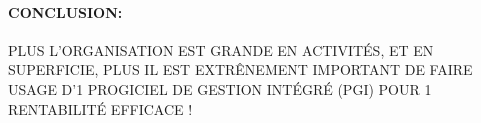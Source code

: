 \documentclass[12pt, a4paper]{article}
\newcommand{\yerothvert}[1]{\textcolor{yerothColorGreen}{#1}\xspace}
\begin{document}
\paragraph{CONCLUSION:}

\yerothvert{PLUS L'ORGANISATION EST GRANDE EN ACTIVITÉS, ET EN
SUPERFICIE, PLUS IL EST EXTRÊNEMENT IMPORTANT DE FAIRE
USAGE D'1 PROGICIEL DE GESTION INTÉGRÉ (PGI) POUR 1 RENTABILITÉ
EFFICACE !}
\end{document}

